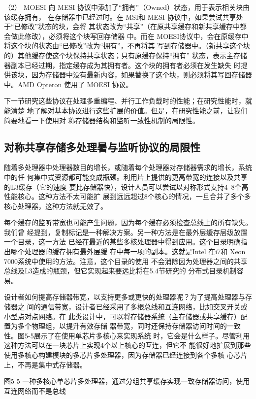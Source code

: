 （2） MOESI 向 MESI 协议中添加了“拥有”（Owned）状态，用于表示相关块由该缓存拥有，
在存储器中已经过时。在 MSI和 MESI 协议中，如果尝试共享处于“已修改”状态的块，会将
其状态改为“共享”（在原共享缓存和新共享缓存中都会做此修改），必须将这个块写回存储器
中。而在 MOESI协议中，会在原缓存中将这个块的状态由“已修改”改为“拥有”，不再将其
写到存储器中。（新共享这个块的）其他缓存使这个块保持共享状态；只有原缓存保持“拥有”
状态，表示主存储器副本已经过期，指定缓存成为其拥有者。这个块的拥有者必须在发生缺失
时提供该块，因为存储器中没有最新内容，如果替换了这个块，则必须将其写回存储器中。AMD
Opteron 使用了 MOESI 协议。

下一节研究这些协议在处理多重编程、并行工作负载时的性能；在研究性能时，就能清楚
地了解对基本协议进行这些扩展的价值。但是，在研究性能之前，让我们简要地看一下使用对
称存储器结构和监听一致性机制的局限性。

\subsection{对称共享存储多处理暑与监听协议的局限性}
随着多处理器中处理器数目的增长，或随着每个处理器对存储器需求的增长，系统中的任
何集中式资源都可能变成瓶颈。利用片上提供的更高带宽的连接以及共享的L3缓存（它的速度
要比存储器快），设计人员可以尝试以对称形式支持4~8个高性能核心。这种方法不太可能扩
展到远远超过8个核心的情况，一旦合并了多个多核心处理器，这种方法就无效了。

每个缓存的监听带宽也可能产生问题，因为每个缓存必须检查总线上的所有缺失。我们曾
经提到，复制标记是一种解决方案。另一种方法是在最外层缓存层级放置一个目录，这一方法
已经在最近的某些多核处理器中得到应用。这个目录明确指出哪个处理器的缓存拥有最外层缓
存中每一项的副本。这就是Intel 在i7和 Xeon 7000系统中使用的方法。注意，这个目录的使用
不会消除因为处理器之间的共享总线及L3造成的瓶颈，但它实现起来要远比将在5.4节研究的
分布式目录机制容易。

设计者如何提高存储器带宽，以支持更多或更快的处理器呢？为了提高处理器与存储器之
间的通信带宽，设计者已经采用了多根总线和互连网络，比如交叉开关或小型点对点网络。在
此类设计中，可以将存储器系统（主存储器或共享缓存）配置为多个物理组，以提升有效存储
器带宽，同时还保持存储器访问时间的一致性。图5-5展示了在使用单芯片多核心来实现系统
时，它会是什么样子。尽管利用这种方法可以在一块芯片上实现4个以上核心的互连，但它不
能很好地扩展到那些使用多核心构建模块的多芯片多处理器，因为存储器已经连接到各个多核
心芯片上，不再是集中式存储器。

图5-5 一种多核心单芯片多处理器，通过分组共享缓存实现一致存储器访问，使用互连网络而不是总线

